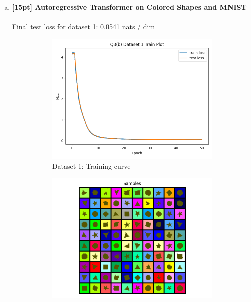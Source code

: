 \documentclass{article}
\begin{document}
\begin{enumerate}[(a)]
\newpage

\item {\bf [15pt] Autoregressive Transformer on Colored Shapes and MNIST} \\\\
Final test loss for dataset 1: 0.0541  nats / dim
\begin{figure}[H]
    \centering
    \begin{subfigure}{0.45\textwidth}
        \centering
        \includegraphics[width=\textwidth]{figures/q3_b_dset1_train_plot.png}
        \caption{Dataset 1: Training curve}
    \end{subfigure}
    \hspace{0.2in}
    \begin{subfigure}{0.45\textwidth}
        \centering
        \includegraphics[width=\textwidth]{figures/q3_b_dset1_samples.png}

\end{subfigure}
\end{figure}
\end{enumerate}
\end{document}
